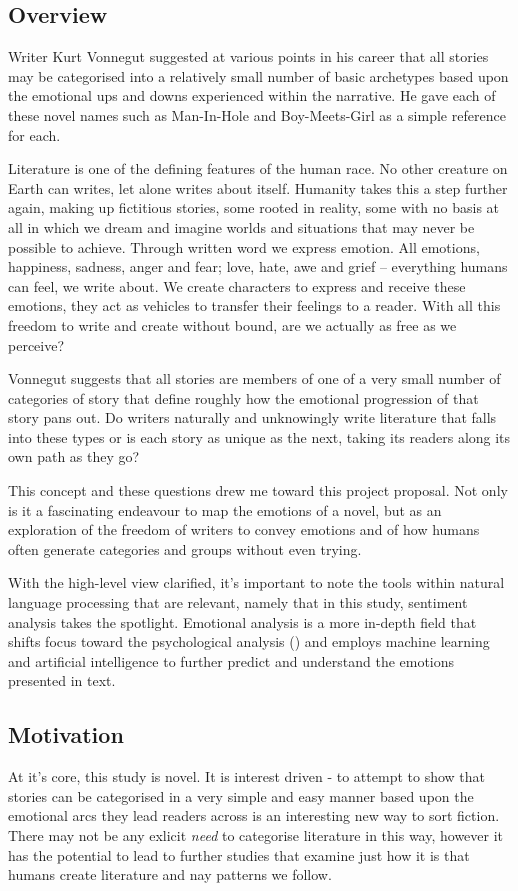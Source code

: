 \documentclass[a4paper]{article}
\begin{document}
    \subsection{Overview}
        Writer Kurt Vonnegut suggested at various points in his career that all stories may be categorised into a relatively small number of basic archetypes based upon the emotional ups and downs experienced within the narrative. He gave each of these novel names such as Man-In-Hole and Boy-Meets-Girl as a simple reference for each. \cite{vonnegutLecture}

        Literature is one of the defining features of the human race. No other creature on Earth can writes, let alone writes about itself. Humanity takes this a step further again, making up fictitious stories, some rooted in reality, some with no basis at all in which we dream and imagine worlds and situations that may never be possible to achieve. Through written word we express emotion. All emotions, happiness, sadness, anger and fear; love, hate, awe and grief – everything humans can feel, we write about. We create characters to express and receive these emotions, they act as vehicles to transfer their feelings to a reader. With all this freedom to write and create without bound, are we actually as free as we perceive?

        Vonnegut suggests that all stories are members of one of a very small number of categories of story that define roughly how the emotional progression of that story pans out. Do writers naturally and unknowingly write literature that falls into these types or is each story as unique as the next, taking its readers along its own path as they go?

        This concept and these questions drew me toward this project proposal. Not only is it a fascinating endeavour to map the emotions of a novel, but as an exploration of the freedom of writers to convey emotions and of how humans often generate categories and groups without even trying.

        With the high-level view clarified, it's important to note the tools within natural language processing that are relevant, namely that in this study, sentiment analysis takes the spotlight. Emotional analysis is a more in-depth field that shifts focus toward the psychological analysis (\cite{sentimentVsEmotionAnalysis}) and employs machine learning and artificial intelligence to further predict and understand the emotions presented in text.
    \subsection{Motivation}
        At it's core, this study is novel. It is interest driven - to attempt to show that stories can be categorised in a very simple and easy manner based upon the emotional arcs they lead readers across is an interesting new way to sort fiction. There may not be any exlicit \textit{need} to categorise literature in this way, however it has the potential to lead to further studies that examine just how it is that humans create literature and nay patterns we follow.
\end{document}
